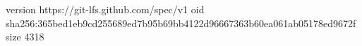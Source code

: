 version https://git-lfs.github.com/spec/v1
oid sha256:365bed1eb9cd255689ed7b95b69bb4122d96667363b60ea061ab05178ed9672f
size 4318

